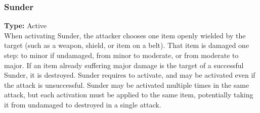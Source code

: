 \subsubsection{Sunder}
\label{iqty:sunder}
\textbf{Type:} Active\\
When activating Sunder, the attacker chooses one item
openly wielded by the target (such as a weapon, shield, or
item on a belt). That item is damaged one step: to minor
if undamaged, from minor to moderate, or from moderate
to major. If an item already suffering major damage is
the target of a successful Sunder, it is destroyed.
Sunder requires \advantage\advantage to activate, and may be activated
even if the attack is unsuccessful. Sunder may be activated
multiple times in the same attack, but each activation
must be applied to the same item, potentially taking
it from undamaged to destroyed in a single attack.
